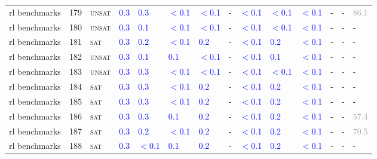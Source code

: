 \begin{center}
{\begin{longtable}{@{}llllllllllllll@{}}
rl benchmarks & 179 & \textsc{unsat} & \textcolor{blue}{0.3} & \textcolor{blue}{0.3} & \textcolor{blue}{$<$0.1} & \textcolor{blue}{$<$0.1} & - & \textcolor{blue}{$<$0.1} & \textcolor{blue}{$<$0.1} & \textcolor{blue}{$<$0.1} & - & - & \textcolor{darkgray}{86.1} \\
rl benchmarks & 180 & \textsc{unsat} & \textcolor{blue}{0.3} & \textcolor{blue}{0.1} & \textcolor{blue}{$<$0.1} & \textcolor{blue}{$<$0.1} & - & \textcolor{blue}{$<$0.1} & \textcolor{blue}{$<$0.1} & \textcolor{blue}{$<$0.1} & - & - & - \\
rl benchmarks & 181 & \textsc{sat} & \textcolor{blue}{0.3} & \textcolor{blue}{0.2} & \textcolor{blue}{$<$0.1} & \textcolor{blue}{0.2} & - & \textcolor{blue}{$<$0.1} & \textcolor{blue}{0.2} & \textcolor{blue}{$<$0.1} & - & - & - \\
rl benchmarks & 182 & \textsc{unsat} & \textcolor{blue}{0.3} & \textcolor{blue}{0.1} & \textcolor{blue}{0.1} & \textcolor{blue}{$<$0.1} & - & \textcolor{blue}{$<$0.1} & \textcolor{blue}{0.1} & \textcolor{blue}{$<$0.1} & - & - & - \\
rl benchmarks & 183 & \textsc{unsat} & \textcolor{blue}{0.3} & \textcolor{blue}{0.3} & \textcolor{blue}{$<$0.1} & \textcolor{blue}{$<$0.1} & - & \textcolor{blue}{$<$0.1} & \textcolor{blue}{$<$0.1} & \textcolor{blue}{$<$0.1} & - & - & - \\
rl benchmarks & 184 & \textsc{sat} & \textcolor{blue}{0.3} & \textcolor{blue}{0.3} & \textcolor{blue}{$<$0.1} & \textcolor{blue}{0.2} & - & \textcolor{blue}{$<$0.1} & \textcolor{blue}{0.2} & \textcolor{blue}{$<$0.1} & - & - & - \\
rl benchmarks & 185 & \textsc{sat} & \textcolor{blue}{0.3} & \textcolor{blue}{0.3} & \textcolor{blue}{$<$0.1} & \textcolor{blue}{0.2} & - & \textcolor{blue}{$<$0.1} & \textcolor{blue}{0.2} & \textcolor{blue}{$<$0.1} & - & - & - \\
rl benchmarks & 186 & \textsc{sat} & \textcolor{blue}{0.3} & \textcolor{blue}{0.3} & \textcolor{blue}{0.1} & \textcolor{blue}{0.2} & - & \textcolor{blue}{$<$0.1} & \textcolor{blue}{0.2} & \textcolor{blue}{$<$0.1} & - & - & \textcolor{darkgray}{57.4} \\
rl benchmarks & 187 & \textsc{sat} & \textcolor{blue}{0.3} & \textcolor{blue}{0.2} & \textcolor{blue}{$<$0.1} & \textcolor{blue}{0.2} & - & \textcolor{blue}{$<$0.1} & \textcolor{blue}{0.2} & \textcolor{blue}{$<$0.1} & - & - & \textcolor{darkgray}{70.5} \\
rl benchmarks & 188 & \textsc{sat} & \textcolor{blue}{0.3} & \textcolor{blue}{$<$0.1} & \textcolor{blue}{0.1} & \textcolor{blue}{0.2} & - & \textcolor{blue}{$<$0.1} & \textcolor{blue}{0.2} & \textcolor{blue}{$<$0.1} & - & - & - \\

\end{longtable}}
\end{center}
